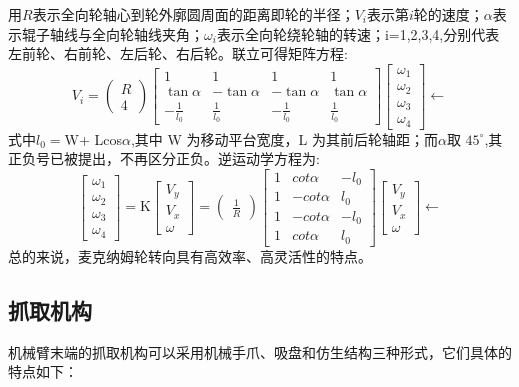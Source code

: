 \documentclass{paper}
\begin{document}
用$R$表示全向轮轴心到轮外廓圆周面的距离即轮的半径；$V_i$表示第$i$轮的速度；$\alpha$表示辊子轴线与全向轮轴线夹角；$\omega_i$表示全向轮绕轮轴的转速；i=1,2,3,4,分别代表左前轮、右前轮、左后轮、右后轮。联立可得矩阵方程:
\[ V_i=\begin{pmatrix}R\\4\end{pmatrix}\begin{bmatrix}1&1&1&1\\\tan\alpha&-\tan\alpha&-\tan\alpha&\tan\alpha\\-\frac{1}{l_0}&\frac{1}{l_0}&-\frac{1}{l_0}&\frac{1}{l_0}\end{bmatrix}\begin{bmatrix}\omega_1\\\omega_2\\\omega_3\\\omega_4\end{bmatrix}\leftarrow  \]
式中$l_0=$W+ Lcos$\alpha$,其中 W 为移动平台宽度，L 为其前后轮轴距；而$\alpha$取
$45^{\circ}$,其正负号已被提出，不再区分正负。逆运动学方程为:
\[\begin{bmatrix}\omega_1\\\omega_2\\\omega_3\\\omega_4\end{bmatrix}=\text{K}\begin{bmatrix}V_y\\V_x\\\omega\end{bmatrix}=\begin{pmatrix}\frac{1}{R}\end{pmatrix}\begin{bmatrix}1&cot\alpha&-l_0\\1&-cot\alpha&l_0\\1&-cot\alpha&-l_0\\1&cot\alpha&l_0\end{bmatrix}\begin{bmatrix}V_y\\V_x\\\omega\end{bmatrix}\leftarrow \]
总的来说，麦克纳姆轮转向具有高效率、高灵活性的特点。
\subsection{抓取机构}
\label{subsec:label}
机械臂末端的抓取机构可以采用机械手爪、吸盘和仿生结构三种形式，它们具体的特点如下：
\end{document}
